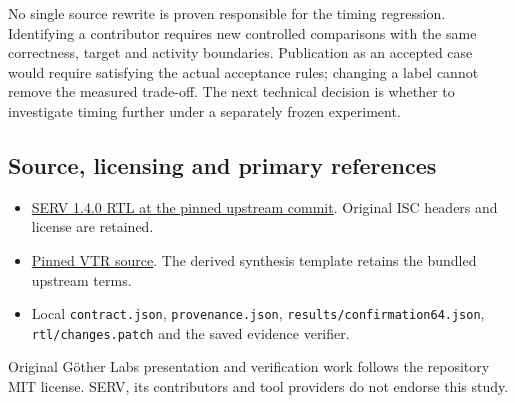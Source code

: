 No single source rewrite is proven responsible for the timing regression. Identifying a contributor requires new controlled comparisons with the same correctness, target and activity boundaries. Publication as an accepted case would require satisfying the actual acceptance rules; changing a label cannot remove the measured trade-off. The next technical decision is whether to investigate timing further under a separately frozen experiment.

\subsection{Source, licensing and primary references}
{\small
\begin{itemize}
\item \href{https://github.com/olofk/serv/tree/7d9cde4e6ca4f4c84d7512a752a4c187537dd373/rtl}{SERV 1.4.0 RTL at the pinned upstream commit}. Original ISC headers and license are retained.
\item \href{https://github.com/verilog-to-routing/vtr-verilog-to-routing/tree/95f5c6de9e158371ba7185bf97c07a84153735d6}{Pinned VTR source}. The derived synthesis template retains the bundled upstream terms.
\item Local \texttt{contract.json}, \texttt{provenance.json}, \texttt{results/confirmation64.json}, \texttt{rtl/changes.patch} and the saved evidence verifier.
\end{itemize}
}
Original Göther Labs presentation and verification work follows the repository MIT license. SERV, its contributors and tool providers do not endorse this study.

